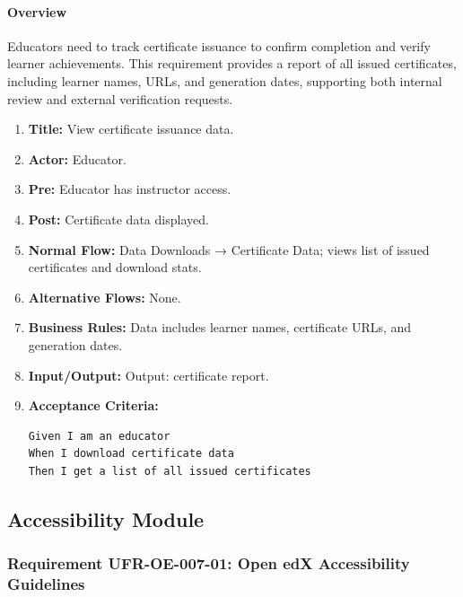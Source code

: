 \paragraph{Overview}
Educators need to track certificate issuance to confirm completion and verify learner achievements. This requirement provides a report of all issued certificates, including learner names, URLs, and generation dates, supporting both internal review and external verification requests.
\begin{enumerate}[label=\textbf{\arabic*.}]
\item \textbf{Title:} View certificate issuance data.
\item \textbf{Actor:} Educator.
\item \textbf{Pre:} Educator has instructor access.
\item \textbf{Post:} Certificate data displayed.
\item \textbf{Normal Flow:} Data Downloads → Certificate Data; views list of issued certificates and download stats.
\item \textbf{Alternative Flows:} None.
\item \textbf{Business Rules:} Data includes learner names, certificate URLs, and generation dates.
\item \textbf{Input/Output:} Output: certificate report.
\item \textbf{Acceptance Criteria:}
    \begin{verbatim}
Given I am an educator
When I download certificate data
Then I get a list of all issued certificates
    \end{verbatim}
\end{enumerate}

\subsection{Accessibility Module}
\subsubsection{Requirement UFR-OE-007-01: Open edX Accessibility Guidelines}
